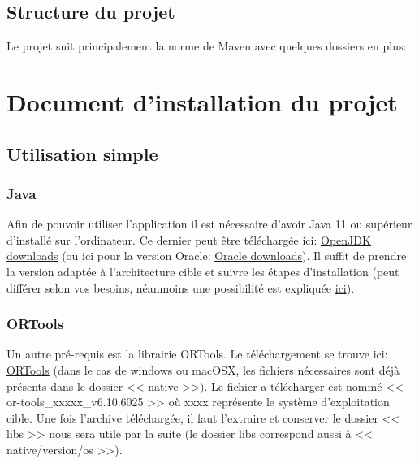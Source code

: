 \documentclass[final]{polytech/polytech}
\begin{document}
	\section{Structure du projet}
		Le projet suit principalement la norme de Maven avec quelques dossiers en plus:
	
\chapter{Document d'installation du projet}
	\section{Utilisation simple}
		\subsection{Java\label{sec:install:java}}
			Afin de pouvoir utiliser l'application il est nécessaire d'avoir Java 11 ou supérieur d'installé sur l'ordinateur.
			Ce dernier peut être téléchargée ici: \href{https://jdk.java.net/}{OpenJDK downloads} (ou ici pour la version Oracle: \href{https://www.oracle.com/technetwork/java/javase/downloads/index.html}{Oracle downloads}).
			Il suffit de prendre la version adaptée à l'architecture cible et suivre les étapes d'installation (peut différer selon vos besoins, néanmoins une possibilité est expliquée \href{https://stackoverflow.com/a/52531093/3281185}{ici}).

		\subsection{ORTools}
			Un autre pré-requis est la librairie ORTools.
			Le téléchargement se trouve ici: \href{https://github.com/google/or-tools/releases/tag/v6.10}{ORTools} (dans le cas de windows ou macOSX, les fichiers nécessaires sont déjà présents dans le dossier << native >>).
			Le fichier a télécharger est nommé << or-tools\_xxxxx\_v6.10.6025 >> où xxxx représente le système d'exploitation cible.
			Une fois l'archive téléchargée, il faut l'extraire et conserver le dossier << libs >> nous sera utile par la suite (le dossier libs correspond aussi à << native/version/os >>).
\end{document}

